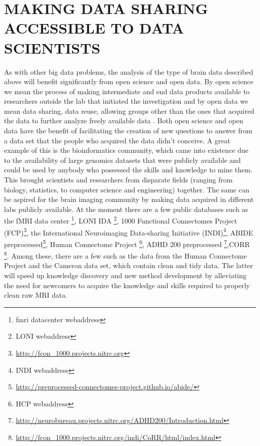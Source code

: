 \section{MAKING DATA SHARING ACCESSIBLE TO DATA SCIENTISTS}

As with other big data problems, the analysis of the type of brain data
described above will benefit significantly from open science and open data. By
open science we mean the process of making intermediate and end data products
available to researchers outside the lab that initiated the investigation and
by open data we mean data sharing, data reuse, allowing groups other than the
ones that acquired the data to further analyze freely available data
\cite{Milham2012}. Both open science and open data have the benefit of
facilitating the creation of new questions to answer from a data set that the
people who acquired the data didn't conceive. A great example of this is the
bioinformatics community, which came into existence due to the availability of
large genomics datasets that were publicly available and could be used by
anybody who possessed the skills and knowledge to mine them\cite{VanHorn2013}.
This brought scientists and researchers from disparate fields (ranging from
biology, statistics, to computer science and engineering) together. The same
can be aspired for the brain imaging community by making data acquired in
different labs publicly available. At the moment there are a few public
databases such as the fMRI data center \footnote{fmri datacenter webaddress},
LONI IDA \footnote{LONI webaddress}, 1000 Functional Connectomes Project
(FCP)\footnote{\url{http://fcon_1000.projects.nitrc.org}}, the International
Neuroimaging Data-sharing Initiative (INDI)\footnote{INDI webaddress}, ABIDE
preprocessed\footnote{\url{http://preprocessed-connectomes-project.github.io/abide/}},
Human Connectome Project \footnote{HCP webaddress}, ADHD 200 preprocessed
\footnote{\url{http://neurobureau.projects.nitrc.org/ADHD200/Introduction.html}},CORR
\footnote{\url{http://fcon_1000.projects.nitrc.org/indi/CoRR/html/index.html}}.
Among these, there are a few such as the data from the Human Connectome Project
and the Cameron data set, which contain clean and tidy data. The latter will
speed up knowledge discovery and new method development by alleviating the need
for newcomers to acquire the knowledge and skills required to properly clean
raw MRI data. 

